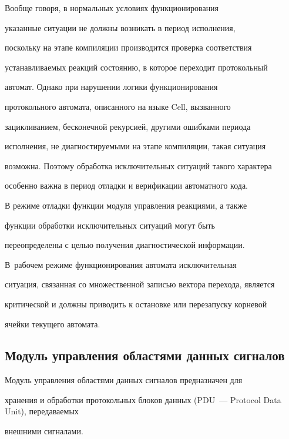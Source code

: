       


      Вообще говоря, в нормальных условиях функционирования 


указанные ситуации не должны возникать  в период исполнения, 


поскольку на этапе компиляции производится проверка соответствия 


устанавливаемых реакций состоянию, в которое переходит протокольный 


автомат. Однако при нарушении логики функционирования 


протокольного автомата, описанного на языке Cell, вызванного 


зацикливанием, бесконечной рекурсией, другими ошибками периода 


исполнения, не диагностируемыми на этапе компиляции, такая ситуация 


возможна. Поэтому обработка исключительных ситуаций такого характера 


особенно важна в период отладки и верификации автоматного кода. 


      


      В режиме отладки функции модуля управления реакциями, а также 


функции обработки исключительных ситуаций могут быть 


переопределены  с целью получения диагностической информации. 


В~рабочем режиме  функционирования автомата исключительная 


ситуация, связанная со множественной записью вектора перехода, является 


критической и должны приводить к остановке или перезапуску корневой 


ячейки текущего автомата.


      


\subsection{Модуль управления областями данных сигналов}


      


      Модуль управления областями данных сигналов предназначен для 


хранения и обработки протокольных блоков данных (PDU~--- Protocol Data Unit), передаваемых 


внешними сигналами. 


